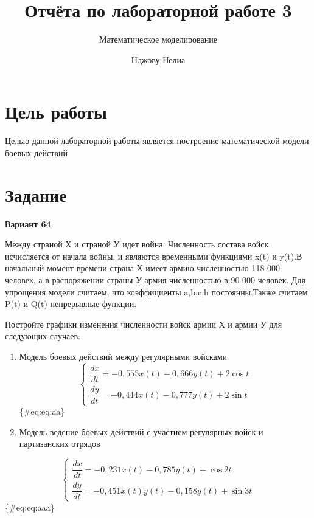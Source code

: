 \documentclass[
  12pt,
  a4paper,
  DIV=11,
  numbers=noendperiod]{scrreprt}
\title{Отчёта по лабораторной работе 3}
\subtitle{Математическое моделирование}
\author{Нджову Нелиа}
\date{}
\renewcommand*\contentsname{Содержание}
\newcommand\contentsname{Содержание}
\begin{document}
\maketitle

\renewcommand*\contentsname{Содержание}
{
\setcounter{tocdepth}{1}
\tableofcontents
}
\listoffigures
\listoftables
{}
\chapter{Цель
работы}\label{ux446ux435ux43bux44c-ux440ux430ux431ux43eux442ux44b}

Целью данной лабораторной работы является построение математической
модели боевых действий

\chapter{Задание}\label{ux437ux430ux434ux430ux43dux438ux435}

\textbf{Вариант 64}

Между страной Х и страной У идет война. Численность состава войск
исчисляется от начала войны, и являются временными функциями x(t) и
y(t).В начальный момент времени страна Х имеет армию численностью 118
000 человек, а в распоряжении страны У армия численностью в 90 000
человек. Для упрощения модели считаем, что коэффициенты a,b,c,h
постоянны.Также считаем P(t) и Q(t) непрерывные функции.

Постройте графики изменения численности войск армии Х и армии У для
следующих случаев:

\begin{enumerate}
\def\labelenumi{\arabic{enumi}.}
\item
  Модель боевых действий между регулярными войсками \[
  \begin{cases}
  \dfrac{dx}{dt} = -0,555x(t)-0,666y(t)+ 2\cos{t}\\
  \dfrac{dy}{dt} = -0,444x(t)-0,777y(t)+ 2\sin{t}
  \end{cases}
  \]\{\#eq:eq:aa\}
\item
  Модель ведение боевых действий с участием регулярных войск и
  партизанских отрядов
\end{enumerate}

\[
\begin{cases}
\dfrac{dx}{dt} = -0,231x(t)-0,785y(t)+\cos{2t}\\
\dfrac{dy}{dt} = -0,451x(t)y(t)-0,158y(t)+\sin{3t}
\end{cases}
\]\{\#eq:eq:aaa\}
\end{document}
